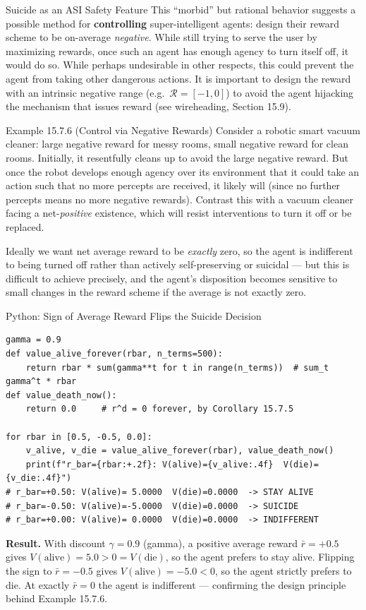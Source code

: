 \documentclass[aspectratio=169,10pt]{beamer}
\newcommand{\Rc}{\mathcal{R}}
\begin{document}
\begin{frame}{Suicide as an ASI Safety Feature}
  This ``morbid'' but rational behavior suggests a possible method for
  \textbf{controlling} super-intelligent agents: design their reward
  scheme to be on-average \emph{negative}. While still trying to serve the
  user by maximizing rewards, once such an agent has enough agency to turn
  itself off, it would do so. While perhaps undesirable in other respects,
  this could prevent the agent from taking other dangerous actions. It is
  important to design the reward with an intrinsic negative range (e.g.\
  $\Rc=[-1,0]$) to avoid the agent hijacking the mechanism that issues
  reward (see wireheading, Section 15.9).

  \begin{block}{Example 15.7.6 (Control via Negative Rewards)}
    Consider a robotic smart vacuum cleaner: large negative reward for
    messy rooms, small negative reward for clean rooms. Initially, it
    resentfully cleans up to avoid the large negative reward. But once the
    robot develops enough agency over its environment that it could take
    an action such that no more percepts are received, it likely will
    (since no further percepts means no more negative rewards). Contrast
    this with a vacuum cleaner facing a net-\emph{positive} existence,
    which will resist interventions to turn it off or be replaced.
  \end{block}
  Ideally we want net average reward to be \emph{exactly} zero, so the
  agent is indifferent to being turned off rather than actively
  self-preserving or suicidal --- but this is difficult to achieve
  precisely, and the agent's disposition becomes sensitive to small
  changes in the reward scheme if the average is not exactly zero.
\end{frame}

\begin{frame}[fragile]{Python: Sign of Average Reward Flips the Suicide Decision}
  \begin{lstlisting}
gamma = 0.9
def value_alive_forever(rbar, n_terms=500):
    return rbar * sum(gamma**t for t in range(n_terms))  # sum_t gamma^t * rbar
def value_death_now():
    return 0.0     # r^d = 0 forever, by Corollary 15.7.5

for rbar in [0.5, -0.5, 0.0]:
    v_alive, v_die = value_alive_forever(rbar), value_death_now()
    print(f"r_bar={rbar:+.2f}: V(alive)={v_alive:.4f}  V(die)={v_die:.4f}")
# r_bar=+0.50: V(alive)= 5.0000  V(die)=0.0000  -> STAY ALIVE
# r_bar=-0.50: V(alive)=-5.0000  V(die)=0.0000  -> SUICIDE
# r_bar=+0.00: V(alive)= 0.0000  V(die)=0.0000  -> INDIFFERENT
  \end{lstlisting}
  \textbf{Result.} With discount $\gamma=0.9$ (gamma), a positive average
  reward $\bar r=+0.5$ gives $V(\text{alive})=5.0>0=V(\text{die})$, so the
  agent prefers to stay alive. Flipping the sign to $\bar r=-0.5$ gives
  $V(\text{alive})=-5.0<0$, so the agent strictly prefers to die. At
  exactly $\bar r=0$ the agent is indifferent --- confirming the design
  principle behind Example 15.7.6.
\end{frame}
\end{document}
